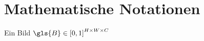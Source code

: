 \section{Mathematische Notationen}
\label{mathematische_notationen}



Ein Bild $\gls{B} \in {\left[0, 1\right]}^{H \times W \times C}$
